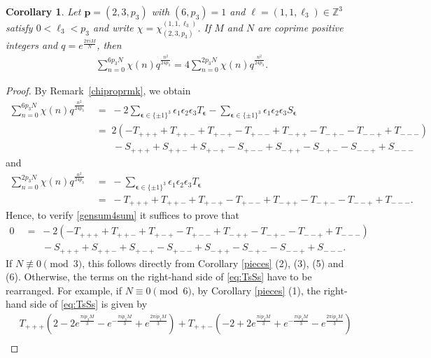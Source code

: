 \documentclass[11pt,reqno]{amsart}
\newtheorem{corollary}[theorem]{Corollary}
\theoremstyle{definition}
\numberwithin{equation}{section}
\newcommand{\bea}{\begin{equation}\begin{aligned}}
\newcommand{\eea}{\end{aligned}\end{equation}}
\renewcommand{\=}{\;=\;}
\begin{document}
\begin{corollary} \label{ex} Let $\bm{p} = (2,3, p_3)$ with $(6,p_3)=1$ and $\bm{\ell} = (1, 1, \ell_3) \in \mathbb{Z}^3$ satisfy $0 < \ell_3 < p_3$ and write $\chi = \chi_{(2, 3, p_3)}^{(1,1,\ell_3)}$. If $M$ and $N$ are coprime positive integers and $q=e^{\frac{2\pi i M}{N}}$, then
\bea\label{gensum4sum}
\sum_{n=0}^{6p_3N} \chi(n) q^{\frac{n^2}{24p_3}} = 4 \sum_{n=0}^{2p_3N} \chi(n) q^{\frac{n^2}{24p_3}}.
\eea
\end{corollary}
\begin{proof}
By Remark~\ref{chiproprmk}, we obtain
\begin{align*}
\sum_{n=0}^{6p_3N} \chi(n) q^{\frac{n^2}{24p_3}} &\= 
-2\sum_{\bm \epsilon\in\{\pm1\}^3} \epsilon_1\epsilon_2\epsilon_3 T_{\bm \epsilon}
- \sum_{\bm \epsilon \in \{\pm1\}^3}
\epsilon_1\epsilon_2\epsilon_3  S_{\bm \epsilon} \\ \nonumber
&\=2 \left( - T_{ + + + } + T_{ + + - } + T_{ + - + } - T_{ + - - } + T_{ - + + } - T_{ - + - } - T_{ - - + } + T_{ - - - } \right) \\ \nonumber
&\qquad - S_{ + + + } + S_{ + + - } + S_{ + - + } - S_{ + - - } + S_{ - + + } - S_{ - + - } - S_{ - - + } + S_{ - - - }
\end{align*}
and
\begin{align*}
\sum_{n=0}^{2p_3N} \chi(n) q^{\frac{n^2}{24p_3}} &\= -\sum_{\bm \epsilon\in\{\pm1\}^3} \epsilon_1\epsilon_2\epsilon_3 T_{\bm \epsilon} \\ \nonumber
&\=
- T_{ + + + } + T_{ + + - } + T_{ + - + } - T_{ + - - } + T_{ - + + } - T_{ - + - } - T_{ - - + } + T_{ - - - }.
\end{align*}
Hence, to verify \eqref{gensum4sum} it suffices to prove that
\bea\label{eq:TsSs}
0 &\= -2 \left(- T_{ + + + } + T_{ + + - } + T_{ + - + } - T_{ + - - } + T_{ - + + } - T_{ - + - } - T_{ - - + } + T_{ - - - } \right) \\
&\qquad - S_{ + + + } + S_{ + + - } + S_{ + - + } - S_{ + - - } + S_{ - + + } - S_{ - + - } - S_{ - - + } + S_{ - - - }.
\eea
If $N \not \equiv 0 \pmod{3}$, this follows directly from Corollary \ref{pieces} (2), (3), (5) and (6). Otherwise, the terms on the right-hand side of \eqref{eq:TsSs} have to be rearranged. For example, if $N\equiv 0 \pmod 6$, by Corollary \ref{pieces} (1), the right-hand side of \eqref{eq:TsSs} is given by
\begin{equation} \label{Nmod06}
 \begin{aligned}
 &T_{+++} \left( 2-2e^{\frac{\pi i p_3 M}{3}} - e^{-\frac{\pi i p_3 M}{3}} + e^{\frac{2\pi i p_3 M}{3}} \right) +T_{++-} \left(-2+2e^{\frac{\pi i p_3 M}{3}} + e^{-\frac{\pi i p_3 M}{3}} - e^{\frac{2\pi i p_3 M}{3}} \right) \\

\end{aligned}
\end{equation}
\end{proof}
\end{document}

